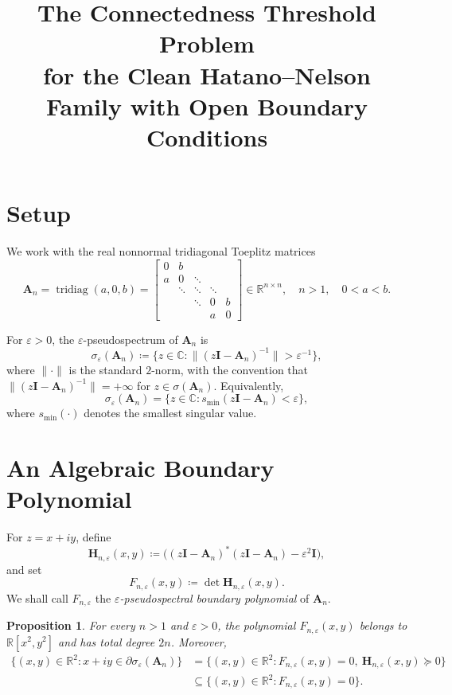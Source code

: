 \documentclass[11pt]{article}
\title{The Connectedness Threshold Problem\\
for the Clean Hatano--Nelson Family with Open Boundary Conditions}
\author{}
\date{}
\newtheorem{proposition}[theorem]{Proposition}
\begin{document}
\maketitle

\section{Setup}

We work with the real nonnormal tridiagonal Toeplitz matrices
\[
\mathbf{A}_n=\operatorname{tridiag}(a,0,b)
=\begin{bmatrix}
0 & b \\
a & 0 & \ddots \\
& \ddots & \ddots & \ddots \\
&& \ddots & 0 & b \\
&&& a & 0
\end{bmatrix}
\in\mathbb{R}^{n\times n},
\quad n>1, \quad 0<a<b.
\]

For $\varepsilon>0$, the $\varepsilon$-pseudospectrum of $\mathbf{A}_n$ is
\[
\sigma_\varepsilon(\mathbf{A}_n)\coloneqq\{z\in\mathbb{C}\colon\|(z\mathbf{I}-\mathbf{A}_n)^{-1}\|>\varepsilon^{-1}\},
\]
where $\|\cdot\|$ is the standard $2$-norm, with the convention that
$\|(z\mathbf{I}-\mathbf{A}_n)^{-1}\|=+\infty$ for $z\in\sigma(\mathbf{A}_n)$.
Equivalently,
\[
\sigma_\varepsilon(\mathbf{A}_n)
=\{z\in\mathbb{C}\colon s_{\min}(z\mathbf{I}-\mathbf{A}_n)<\varepsilon\},
\]
where $s_{\min}(\cdot)$ denotes the smallest singular value.

\section{An Algebraic Boundary Polynomial}

For $z=x+iy$, define
\[
\mathbf{H}_{n,\varepsilon}(x,y)
\coloneqq
\bigl((z\mathbf{I}-\mathbf{A}_n)^*(z\mathbf{I}-\mathbf{A}_n)-\varepsilon^2\mathbf{I}\bigr),
\]
and set
\[
F_{n,\varepsilon}(x,y)\coloneqq \det \mathbf{H}_{n,\varepsilon}(x,y).
\]
We shall call $F_{n,\varepsilon}$ the \emph{$\varepsilon$-pseudospectral boundary polynomial}
of $\mathbf{A}_n$.

\begin{proposition}\label{prop:boundary-polynomial}
For every $n>1$ and $\varepsilon>0$, the polynomial $F_{n,\varepsilon}(x,y)$ belongs to
$\mathbb{R}[x^2,y^2]$ and has total degree $2n$. Moreover,
\[
\begin{aligned}
\bigl\{(x,y)\in\mathbb{R}^2\colon x+iy\in \partial\sigma_\varepsilon(\mathbf{A}_n)\bigr\}
&=\bigl\{(x,y)\in\mathbb{R}^2\colon F_{n,\varepsilon}(x,y)=0, \ \mathbf{H}_{n,\varepsilon}(x,y)\succeq 0\bigr\} \\
&\subseteq \bigl\{(x,y)\in\mathbb{R}^2\colon F_{n,\varepsilon}(x,y)=0\bigr\}.
\end{aligned}
\]
\end{proposition}
\end{document}
